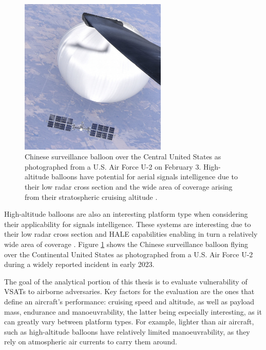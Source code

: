\documentclass[english, 12pt, a4paper, elec, utf8, a-1b, online]{aaltothesis}
\begin{document}
\begin{figure}[h]
  \centering
  \includegraphics[width=70mm]{figures/U-2_Pilot_over_Central_Continental_United_States_(7644960)_(cropped).jpg}
  \caption{Chinese surveillance balloon over the Central United States as photographed from a U.S. Air Force U-2 on February 3. High-altitude balloons have potential for aerial signals intelligence due to their low radar cross section and the wide area of coverage arising from their stratospheric cruising altitude \cite{tomme2005paradigm}.}
  \label{fig-chinese-balloon}
\end{figure}

High-altitude balloons are also an interesting platform type when considering their applicability for signals intelligence. These systems are interesting due to their low radar cross section and HALE capabilities enabling in turn a relatively wide area of coverage \cite{tomme2005paradigm}.
Figure \ref{fig-chinese-balloon} shows the Chinese surveillance balloon flying over the Continental United States as photographed from a U.S. Air Force U-2 during a widely reported incident in early 2023.

The goal of the analytical portion of this thesis is to evaluate vulnerability of VSATs to airborne adversaries.
Key factors for the evaluation are the ones that define an aircraft's performance: cruising speed and altitude, as well as payload mass, endurance and manoeuvrability, the latter being especially interesting, as it can greatly vary between platform types.
For example, lighter than air aircraft, such as high-altitude balloons have relatively limited manoeuvrability, as they rely on atmospheric air currents to carry them around. 
\end{document}
